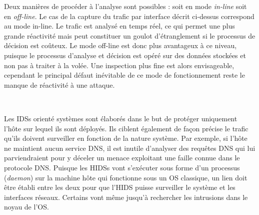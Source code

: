 \documentclass[]{article}
\newcommand{\minit}[1]{\noindent{\small\textbf{ \underline{#1}}}\vspace{0.2cm}}
\begin{document}
\par Deux manières de procéder à l'analyse sont possibles : soit en mode \textit{in-line} soit en \textit{off-line}. Le cas de la capture du trafic par interface décrit ci-dessus correspond au mode in-line. Le trafic est analysé en temps réel, ce qui permet une plus grande réactivité mais peut constituer un goulot d'étranglement si le processus de décision est coûteux. Le mode off-line est donc plus avantageux à ce niveau, puisque le processus d'analyse et décision est opéré sur des données stockées et non pas à traiter à la volée. Une inspection plus fine est alors envisageable, cependant le principal défaut inévitable de ce mode de fonctionnement reste le manque de réactivité à une attaque.

~\\
\minit{Les HIDSs}

\par Les IDSs orienté systèmes sont élaborés dans le but de protéger uniquement l'hôte sur lequel ils sont déployés. Ils ciblent également de façon précise le trafic qu'ils doivent surveiller en fonction de la nature système. Par exemple, si l'hôte ne maintient aucun service DNS, il est inutile d'analyser des requêtes DNS qui lui parviendraient pour y déceler un menace exploitant une faille connue dans le protocole DNS. Puisque les HIDSs vont s'exécuter sous forme d'un processus (\textit{daemon}) sur la machine hôte qui fonctionne sous un OS classique, un lien doit être établi entre les deux pour que l'HIDS puisse surveiller le système et les interfaces réseaux. Certains vont même jusqu'à rechercher les intrusions dans le noyau de l'OS.\\
\end{document}
